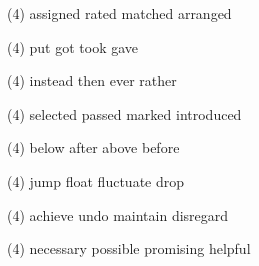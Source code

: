 \begin{tasks}(4)
	\task assigned
	\task rated
	\task matched
	\task arranged
\end{tasks}
\item
\begin{tasks}(4)
	\task put
	\task got
	\task took
	\task gave
\end{tasks}
\item
\begin{tasks}(4)
	\task instead
	\task then
	\task ever
	\task rather
\end{tasks}
\item
\begin{tasks}(4)
	\task selected
	\task passed
	\task marked
	\task introduced
\end{tasks}
\item
\begin{tasks}(4)
	\task below
	\task after
	\task above
	\task before
\end{tasks}
\item
\begin{tasks}(4)
	\task jump
	\task float
	\task fluctuate
	\task drop
\end{tasks}
\item
\begin{tasks}(4)
	\task achieve
	\task undo
	\task maintain
	\task disregard
\end{tasks}
\item
\begin{tasks}(4)
	\task necessary
	\task possible
	\task promising
	\task helpful
\end{tasks}